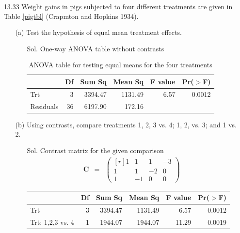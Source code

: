 \documentclass[12pt]{article} %
\begin{document}
\begin{enumerate}
   \item[13.33] Weight gains in pigs subjected to four different treatments are given in Table \ref{pigtbl} (Crapmton 
   and Hopkins 1934).
   	\begin{itemize}
   	 \item[(a)] Test the hypothesis of equal mean treatment effects.
	      \begin{itemize}
		    \item[Sol.] One-way ANOVA table without contrasts
\begin{table}[ht]
\begin{center}
\begin{tabular}{lrrrrr}
  \hline
 & Df & Sum Sq & Mean Sq & F value & Pr($>$F) \\ 
  \hline
Trt & 3 & 3394.47 & 1131.49 & 6.57 & 0.0012 \\ 
  Residuals & 36 & 6197.90 & 172.16 &  &  \\ 
   \hline
\end{tabular}
\caption{ANOVA table for testing equal means for the four treatments}
\end{center}
\end{table}   		  \end{itemize}	       	 
   	 \item[(b)] Using contrasts, compare treatments 1, 2, 3 vs. 4; 1, 2, vs. 3; and 1 vs. 2.
	      \begin{itemize}
		    \item[Sol.] Contrast matrix for the given comparison
		    \begin{eqnarray*}
		    \mathbf{C}&=&
		    \begin{pmatrix}[r]
		     1  &  1  &  1 &  -3 \\
    		 1  &  1  & -2 &   0 \\
    		 1  & -1  &  0 &   0		    
		    \end{pmatrix}
		    \end{eqnarray*}
\begin{table}[ht]
\begin{center}
\begin{tabular}{lrrrrr}
  \hline
 & Df & Sum Sq & Mean Sq & F value & Pr($>$F) \\ 
  \hline
Trt                & 3 & 3394.47 & 1131.49 & 6.57 & 0.0012 \\ 
    Trt: 1,2,3 vs. 4 & 1 & 1944.07 & 1944.07 & 11.29 & 0.0019 \\ 

\end{tabular}
\end{center}
\end{table}
\end{itemize}
\end{itemize}
\end{enumerate}
\end{document}
